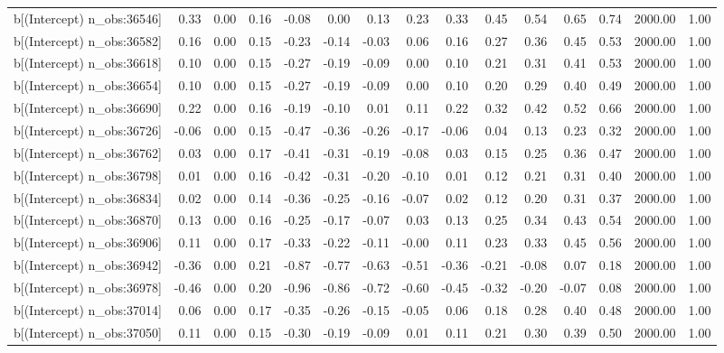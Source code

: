 \begin{table}[ht]
\begin{tabular}{rrrrrrrrrrrrrrr}
  b[(Intercept) n\_obs:36546] & 0.33 & 0.00 & 0.16 & -0.08 & 0.00 & 0.13 & 0.23 & 0.33 & 0.45 & 0.54 & 0.65 & 0.74 & 2000.00 & 1.00 \\ 
  b[(Intercept) n\_obs:36582] & 0.16 & 0.00 & 0.15 & -0.23 & -0.14 & -0.03 & 0.06 & 0.16 & 0.27 & 0.36 & 0.45 & 0.53 & 2000.00 & 1.00 \\ 
  b[(Intercept) n\_obs:36618] & 0.10 & 0.00 & 0.15 & -0.27 & -0.19 & -0.09 & 0.00 & 0.10 & 0.21 & 0.31 & 0.41 & 0.53 & 2000.00 & 1.00 \\ 
  b[(Intercept) n\_obs:36654] & 0.10 & 0.00 & 0.15 & -0.27 & -0.19 & -0.09 & 0.00 & 0.10 & 0.20 & 0.29 & 0.40 & 0.49 & 2000.00 & 1.00 \\ 
  b[(Intercept) n\_obs:36690] & 0.22 & 0.00 & 0.16 & -0.19 & -0.10 & 0.01 & 0.11 & 0.22 & 0.32 & 0.42 & 0.52 & 0.66 & 2000.00 & 1.00 \\ 
  b[(Intercept) n\_obs:36726] & -0.06 & 0.00 & 0.15 & -0.47 & -0.36 & -0.26 & -0.17 & -0.06 & 0.04 & 0.13 & 0.23 & 0.32 & 2000.00 & 1.00 \\ 
  b[(Intercept) n\_obs:36762] & 0.03 & 0.00 & 0.17 & -0.41 & -0.31 & -0.19 & -0.08 & 0.03 & 0.15 & 0.25 & 0.36 & 0.47 & 2000.00 & 1.00 \\ 
  b[(Intercept) n\_obs:36798] & 0.01 & 0.00 & 0.16 & -0.42 & -0.31 & -0.20 & -0.10 & 0.01 & 0.12 & 0.21 & 0.31 & 0.40 & 2000.00 & 1.00 \\ 
  b[(Intercept) n\_obs:36834] & 0.02 & 0.00 & 0.14 & -0.36 & -0.25 & -0.16 & -0.07 & 0.02 & 0.12 & 0.20 & 0.31 & 0.37 & 2000.00 & 1.00 \\ 
  b[(Intercept) n\_obs:36870] & 0.13 & 0.00 & 0.16 & -0.25 & -0.17 & -0.07 & 0.03 & 0.13 & 0.25 & 0.34 & 0.43 & 0.54 & 2000.00 & 1.00 \\ 
  b[(Intercept) n\_obs:36906] & 0.11 & 0.00 & 0.17 & -0.33 & -0.22 & -0.11 & -0.00 & 0.11 & 0.23 & 0.33 & 0.45 & 0.56 & 2000.00 & 1.00 \\ 
  b[(Intercept) n\_obs:36942] & -0.36 & 0.00 & 0.21 & -0.87 & -0.77 & -0.63 & -0.51 & -0.36 & -0.21 & -0.08 & 0.07 & 0.18 & 2000.00 & 1.00 \\ 
  b[(Intercept) n\_obs:36978] & -0.46 & 0.00 & 0.20 & -0.96 & -0.86 & -0.72 & -0.60 & -0.45 & -0.32 & -0.20 & -0.07 & 0.08 & 2000.00 & 1.00 \\ 
  b[(Intercept) n\_obs:37014] & 0.06 & 0.00 & 0.17 & -0.35 & -0.26 & -0.15 & -0.05 & 0.06 & 0.18 & 0.28 & 0.40 & 0.48 & 2000.00 & 1.00 \\ 
  b[(Intercept) n\_obs:37050] & 0.11 & 0.00 & 0.15 & -0.30 & -0.19 & -0.09 & 0.01 & 0.11 & 0.21 & 0.30 & 0.39 & 0.50 & 2000.00 & 1.00 \\ 

\end{tabular}
\end{table}
